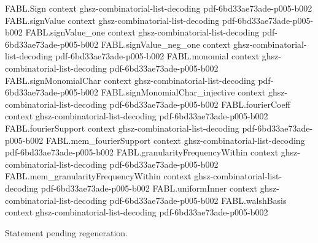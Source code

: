 \begin{theorem}
\label{FABL.parity_orthonormal_basis}
\leanok
{}
\proofstep
  {FABL.Sign}
  {context}
  {ghsz-combinatorial-list-decoding}
  {pdf-6bd33ae73ade-p005-b002}
\proofstep
  {FABL.signValue}
  {context}
  {ghsz-combinatorial-list-decoding}
  {pdf-6bd33ae73ade-p005-b002}
\proofstep
  {FABL.signValue_one}
  {context}
  {ghsz-combinatorial-list-decoding}
  {pdf-6bd33ae73ade-p005-b002}
\proofstep
  {FABL.signValue_neg_one}
  {context}
  {ghsz-combinatorial-list-decoding}
  {pdf-6bd33ae73ade-p005-b002}
\proofstep
  {FABL.monomial}
  {context}
  {ghsz-combinatorial-list-decoding}
  {pdf-6bd33ae73ade-p005-b002}
\proofstep
  {FABL.signMonomialChar}
  {context}
  {ghsz-combinatorial-list-decoding}
  {pdf-6bd33ae73ade-p005-b002}
\proofstep
  {FABL.signMonomialChar_injective}
  {context}
  {ghsz-combinatorial-list-decoding}
  {pdf-6bd33ae73ade-p005-b002}
\proofstep
  {FABL.fourierCoeff}
  {context}
  {ghsz-combinatorial-list-decoding}
  {pdf-6bd33ae73ade-p005-b002}
\proofstep
  {FABL.fourierSupport}
  {context}
  {ghsz-combinatorial-list-decoding}
  {pdf-6bd33ae73ade-p005-b002}
\proofstep
  {FABL.mem_fourierSupport}
  {context}
  {ghsz-combinatorial-list-decoding}
  {pdf-6bd33ae73ade-p005-b002}
\proofstep
  {FABL.granularityFrequencyWithin}
  {context}
  {ghsz-combinatorial-list-decoding}
  {pdf-6bd33ae73ade-p005-b002}
\proofstep
  {FABL.mem_granularityFrequencyWithin}
  {context}
  {ghsz-combinatorial-list-decoding}
  {pdf-6bd33ae73ade-p005-b002}
\proofstep
  {FABL.uniformInner}
  {context}
  {ghsz-combinatorial-list-decoding}
  {pdf-6bd33ae73ade-p005-b002}
\proofstep
  {FABL.walshBasis}
  {context}
  {ghsz-combinatorial-list-decoding}
  {pdf-6bd33ae73ade-p005-b002}

Statement pending regeneration.
\end{theorem}

